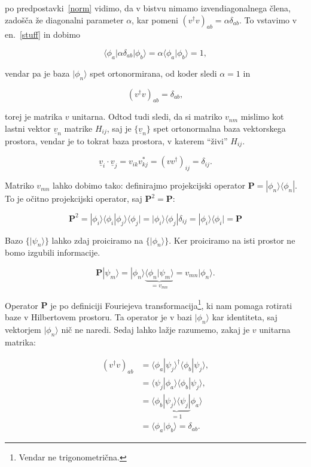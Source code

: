 \documentclass[a4 paper, 12pt]{article}
\begin{document}
po predpostavki~\eqref{norm} vidimo, da v bistvu nimamo izvendiagonalnega člena, zadošča že
diagonalni parameter $\alpha$, kar pomeni $(v^\dagger v)_{ab} = \alpha \delta_{ab}$. To
vstavimo v en.~\eqref{stuff} in dobimo

\begin{equation*}
	\langle\phi_a|\alpha\delta_{ab}|\phi_b\rangle = \alpha\langle\phi_a|\phi_b\rangle = 1,
\end{equation*}

vendar pa je baza ${|\phi_n\rangle}$ spet ortonormirana, od koder sledi $\alpha = 1$ in

\begin{equation}
	(v^\dagger v)_{ab} = \delta_{ab},
\end{equation}

torej je matrika $v$ unitarna. Odtod tudi sledi, da si matriko $v_{nm}$ mislimo kot lastni
vektor $\underline{v}_n$ matrike $H_{ij}$, saj je $\{\underline{v}_n\}$ spet
ortonormalna baza vektorskega prostora, vendar je to tokrat baza prostora, v katerem "`živi"'
$H_{ij}$. 

\[
	\underline{v}_i \cdot \underline{v}_j = v_{ik} v_{kj}^* = (vv^\dagger)_{ij} = \delta_{ij}.
\]

Matriko $v_{mn}$ lahko dobimo tako: definirajmo projekcijski operator
$\mathbf{P} = |\phi_n\rangle\langle\phi_n|$. To je očitno projekcijski operator, saj
$\mathbf{P}^2 = \mathbf{P}$:

\[
	\mathbf{P}^2 = |\phi_i\rangle\langle\phi_i|\phi_j\rangle\langle\phi_j| =
		|\phi_i\rangle\langle\phi_j|\delta_{ij} = |\phi_i\rangle\langle\phi_i| = 
		\mathbf{P}
\]

Bazo $\big\{|\psi_n\rangle\big\}$ lahko zdaj proiciramo na $\big\{|\phi_n\rangle\big\}$.
Ker proiciramo na isti prostor ne bomo izgubili informacije.

\[
	\mathbf{P}|\psi_m\rangle = |\phi_n\rangle\underbrace{\langle\phi_n|\psi_m\rangle}_{=
		v_{mn}} = v_{mn}|\phi_n\rangle.
\]

Operator $\mathbf{P}$ je po definiciji Fouriejeva transformacija\footnote{Vendar ne
trigonometrična.}, ki nam pomaga rotirati baze v Hilbertovem prostoru. Ta operator je v bazi
$|\phi_n\rangle$ kar identiteta, saj vektorjem $|\phi_n\rangle$ nič ne naredi. Sedaj lahko
lažje razumemo, zakaj je $v$ unitarna matrika:

\begin{align*}
	(v^\dagger v)_{ab} &= \langle\phi_a|\psi_j\rangle^\dagger \langle\phi_b|\psi_j\rangle, \\
	&= \langle\psi_j|\phi_a\rangle \langle\phi_b|\psi_j\rangle, \\
	&= \langle\phi_b\underbrace{|\psi_j\rangle\langle\psi_j|}_{= 1}\phi_a\rangle \\
	&= \langle\phi_a|\phi_b\rangle = \delta_{ab}.
\end{align*}
\end{document}
